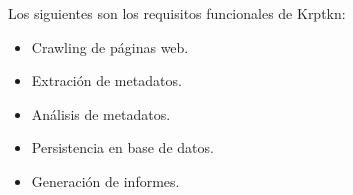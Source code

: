 Los siguientes son los requisitos funcionales de Krptkn:

\begin{itemize}
    \item Crawling de páginas web.
    \item Extración de metadatos.
    \item Análisis de metadatos.
    \item Persistencia en base de datos.
    \item Generación de informes.
\end{itemize}